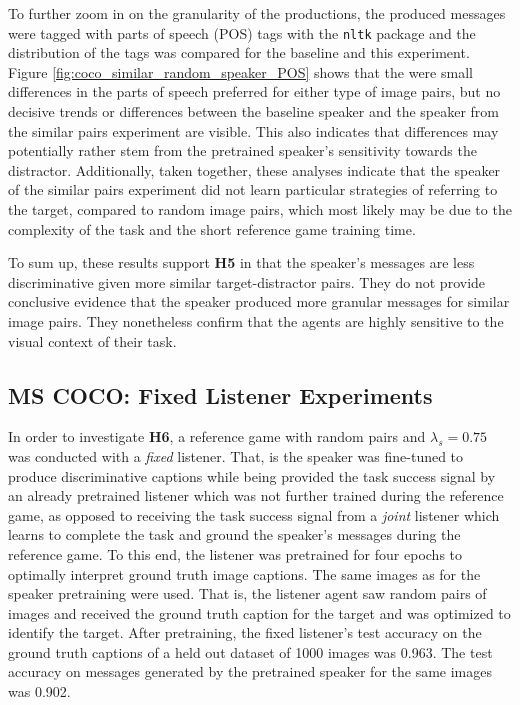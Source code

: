 To further zoom in on the granularity of the productions, the produced messages were tagged with parts of speech (POS) tags with the \texttt{nltk} package \parencite{bird2006nltk} and the distribution of the tags was compared for the baseline and this experiment. Figure \ref{fig:coco_similar_random_speaker_POS} shows that the were small differences in the parts of speech preferred for either type of image pairs, but no decisive trends or differences between the baseline speaker and the speaker from the similar pairs experiment are visible. This also indicates that differences may potentially rather stem from the pretrained speaker's sensitivity towards the distractor. Additionally, taken together, these analyses indicate that the speaker of the similar pairs experiment did not learn particular strategies of referring to the target, compared to random image pairs, which most likely may be due to the complexity of the task and the short reference game training time.

To sum up, these results support \textbf{H5} in that the speaker's messages are less discriminative given more similar target-distractor pairs. They do not provide conclusive evidence that the speaker produced more granular messages for similar image pairs. They nonetheless confirm that the agents are highly sensitive to the visual context of their task.

\subsection{MS COCO: Fixed Listener Experiments}
\label{exp:coco_fixed_listener}
In order to investigate \textbf{H6}, a reference game with random pairs and $\lambda_s=0.75$ was conducted with a \emph{fixed} listener. That, is the speaker was fine-tuned to produce discriminative captions while being provided the task success signal by an already pretrained listener which was not further trained during the reference game, as opposed to receiving the task success signal from a \emph{joint} listener which learns to complete the task and ground the speaker's messages during the reference game. To this end, the listener was pretrained for four epochs to optimally interpret ground truth image captions. The same images as for the speaker pretraining were used. That is, the listener agent saw random pairs of images and received the ground truth caption for the target and was optimized to identify the target. After pretraining, the fixed listener's test accuracy on the ground truth captions of a held out dataset of 1000 images was 0.963. The test accuracy on messages generated by the pretrained speaker for the same images was 0.902.

